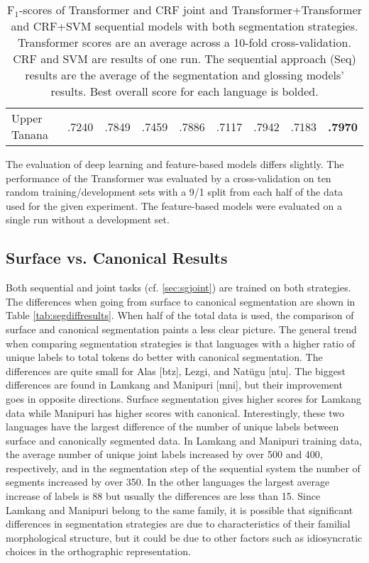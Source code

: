 \begin{table}[!tb]
\begin{tabular}{l|cc|cc|cc|cc}
         \hline
         Upper Tanana & .7240 & .7849 & .7459 & .7886
                      & .7117 & .7942 & .7183 & \textbf{.7970} \\
    \end{tabular}
    \caption[Results of All Segmentation and Glossing Models]{F$_1$-scores of Transformer and CRF joint and Transformer+Transformer and CRF+SVM sequential models with both segmentation strategies. Transformer scores are an average across a 10-fold cross-validation. CRF and SVM are results of one run. The sequential approach (Seq) results are the average of the segmentation and glossing models' results. Best overall score for each language is bolded.}
    \label{tab:allsgresults}
\end{table}


The evaluation of deep learning and feature-based models differs slightly. The performance of the Transformer was evaluated by a cross-validation on ten random training/development sets with a 9/1 split from each half of the data used for the given experiment. The feature-based models were evaluated on a single run without a development set. 


\subsection{Surface vs. Canonical Results}

Both sequential and joint tasks (cf. \autoref{sec:sgjoint}) are trained on both strategies. The differences when going from surface to canonical segmentation are shown in Table \ref{tab:segdiffresults}. When half of the total data is used, the comparison of surface and canonical segmentation paints a less clear picture. The general trend when comparing segmentation strategies is that languages with a higher ratio of unique labels to total tokens do better with canonical segmentation. The differences are quite small for Alas [btz], Lezgi, and Nat\"ugu [ntu]. The biggest differences are found in Lamkang and Manipuri [mni], but their improvement goes in opposite directions. Surface segmentation gives higher scores for Lamkang data while Manipuri has higher scores with canonical. Interestingly, these two languages have the largest difference of the number of unique labels between surface and canonically segmented data. In Lamkang and Manipuri training data, the average number of unique joint labels increased by over 500 and 400, respectively, and in the segmentation step of the sequential system the number of segments increased by over 350. In the other languages the largest average increase of labels is 88 but usually the differences are less than 15. Since Lamkang and Manipuri belong to the same family, it is possible that significant differences in segmentation strategies are due to characteristics of their familial morphological structure, but it could be due to other factors such as idiosyncratic choices in the orthographic representation. 

